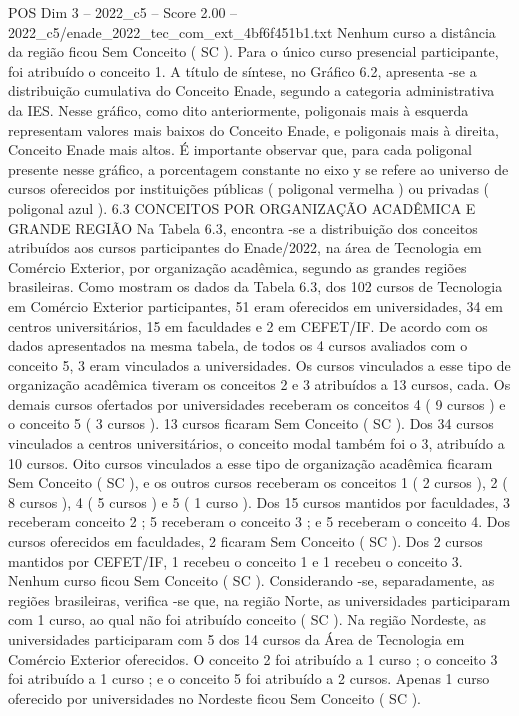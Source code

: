 \begin{textsample}{POS Dim 3 – 2022\_c5 – Score 2.00 – 2022\_c5/enade\_2022\_tec\_com\_ext\_4bf6f451b1.txt}
Nenhum curso a distância da região ficou Sem Conceito ( SC ).
Para o único curso presencial participante, foi atribuído o conceito 1.
A título de síntese, no Gráfico 6.2, apresenta -se a distribuição cumulativa do Conceito Enade, segundo a categoria administrativa da IES.
Nesse gráfico, como dito anteriormente, poligonais mais à esquerda representam valores mais baixos do Conceito Enade, e poligonais mais à direita, Conceito Enade mais altos.
É importante observar que, para cada poligonal presente nesse gráfico, a porcentagem constante no eixo y se refere ao universo de cursos oferecidos por instituições públicas ( poligonal vermelha ) ou privadas ( poligonal azul ). 6.3 CONCEITOS POR ORGANIZAÇÃO ACADÊMICA E GRANDE REGIÃO Na Tabela 6.3, encontra -se a distribuição dos conceitos atribuídos aos cursos participantes do Enade/2022, na área de Tecnologia em Comércio Exterior, por organização acadêmica, segundo as grandes regiões brasileiras.
Como mostram os dados da Tabela 6.3, dos 102 cursos de Tecnologia em Comércio Exterior participantes, 51 eram oferecidos em universidades, 34 em centros universitários, 15 em faculdades e 2 em CEFET/IF.
De acordo com os dados apresentados na mesma tabela, de todos os 4 cursos avaliados com o conceito 5, 3 eram vinculados a universidades.
Os cursos vinculados a esse tipo de organização acadêmica tiveram os conceitos 2 e 3 atribuídos a 13 cursos, cada.
Os demais cursos ofertados por universidades receberam os conceitos 4 ( 9 cursos ) e o conceito 5 ( 3 cursos ). 13 cursos ficaram Sem Conceito ( SC ).
Dos 34 cursos vinculados a centros universitários, o conceito modal também foi o 3, atribuído a 10 cursos.
Oito cursos vinculados a esse tipo de organização acadêmica ficaram Sem Conceito ( SC ), e os outros cursos receberam os conceitos 1 ( 2 cursos ), 2 ( 8 cursos ), 4 ( 5 cursos ) e 5 ( 1 curso ).
Dos 15 cursos mantidos por faculdades, 3 receberam conceito 2 ; 5 receberam o conceito 3 ; e 5 receberam o conceito 4.
Dos cursos oferecidos em faculdades, 2 ficaram Sem Conceito ( SC ).
Dos 2 cursos mantidos por CEFET/IF, 1 recebeu o conceito 1 e 1 recebeu o conceito 3.
Nenhum curso ficou Sem Conceito ( SC ).
Considerando -se, separadamente, as regiões brasileiras, verifica -se que, na região Norte, as universidades participaram com 1 curso, ao qual não foi atribuído conceito ( SC ).
Na região Nordeste, as universidades participaram com 5 dos 14 cursos da Área de Tecnologia em Comércio Exterior oferecidos.
O conceito 2 foi atribuído a 1 curso ; o conceito 3 foi atribuído a 1 curso ; e o conceito 5 foi atribuído a 2 cursos.
Apenas 1 curso oferecido por universidades no Nordeste ficou Sem Conceito ( SC ).

\end{textsample}
